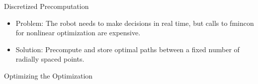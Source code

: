\documentclass[final]{beamer}
\begin{document}
\begin{frame}{}
{\begin{columns}[t]
\begin{column}{.30\linewidth}
\begin{block}{\centering Discretized Precomputation}
\begin{itemize}
	\item Problem: The robot needs to make decisions in real time, but calls to fmincon for nonlinear
		optimization are expensive. 
	\item Solution: Precompute and store optimal paths between a fixed number of radially spaced points. 

\end{itemize}

\vspace{0.3cm}



\end{block}
             

\begin{block}{\centering Optimizing the Optimization}

	\vspace{0.5cm}




\end{block}
\end{column}
\end{columns}}
\end{frame}
\end{document}

